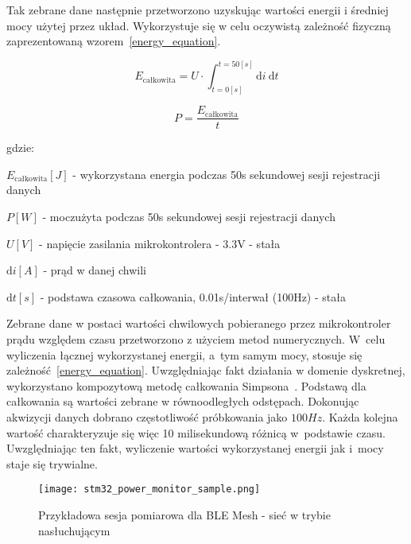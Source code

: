 Tak zebrane dane następnie przetworzono uzyskując wartości energii i średniej mocy
użytej przez układ. Wykorzystuje się w celu oczywistą zależność fizyczną zaprezentowaną
wzorem~\ref{energy_equation}\cite{skoro_marta_fizyka_1973}.

\begin{equation} \label{energy_equation}
E_{\text{całkowita}} = U \cdot \int_{t=0[s]}^{t=50[s]} \mathrm{d}i \: \mathrm{d} t
\end{equation}

\begin{equation} \label{power_equation}
P = \frac{E_{\text{całkowita}}}{t}
\end{equation}

gdzie:

\begin{description}
\item $E_{\text{całkowita}} [J]$ - wykorzystana energia podczas 50s sekundowej sesji rejestracji danych
\item $P [W]$ - moczużyta podczas 50s sekundowej sesji rejestracji danych
\item $U [V]$ - napięcie zasilania mikrokontrolera - 3.3V - stała
\item $\mathrm{d}i [A]$ - prąd w danej chwili
\item $\mathrm{d}t [s]$ - podstawa czasowa całkowania, 0.01s/interwał (100Hz) - stała 
\end{description}

Zebrane dane w postaci wartości chwilowych pobieranego przez mikrokontroler prądu względem czasu
przetworzono z użyciem metod numerycznych. W~celu wyliczenia łącznej wykorzystanej energii, a~tym samym
mocy, stosuje się zależność~\ref{energy_equation}. Uwzględniając fakt działania w domenie dyskretnej,
wykorzystano kompozytową metodę całkowania Simpsona~\cite{noauthor_scipyintegratesimpson_nodate}.
Podstawą dla całkowania są wartości zebrane w równoodległych odstępach. Dokonując akwizycji danych
dobrano częstotliwość próbkowania jako $100Hz$. Każda kolejna wartość charakteryzuje się więc
10 milisekundową różnicą w~podstawie czasu. Uwzględniając ten fakt, wyliczenie wartości
wykorzystanej energii jak i~mocy staje się trywialne.

\begin{figure}[!ht]
	\centering \texttt{[image: stm32\_power\_monitor\_sample.png]}
	\caption{Przykładowa sesja pomiarowa dla BLE Mesh - sieć w trybie nasłuchującym}
	\label{rys:measurement_session_sample}
\end{figure}


